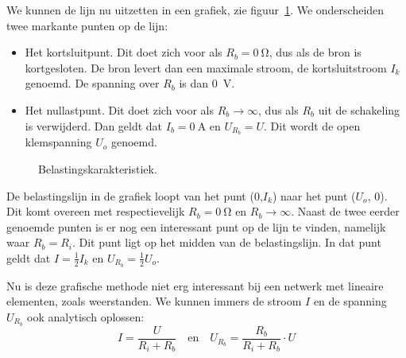 We kunnen de lijn nu uitzetten in een grafiek, zie figuur~\ref{fig:gelbelastingskarakteristiek}.
We onderscheiden twee markante punten op de lijn:

\begin{itemize}
\item Het kortsluitpunt. Dit doet zich voor als $R_b=\SI{0}{\ohm}$, dus als de bron is kortgesloten. De bron
      levert dan een maximale stroom, de kortsluitstroom $I_k$ genoemd. De spanning over $R_b$ is
      dan \SI{0}{\volt}.
\item Het nullastpunt. Dit doet zich voor als $R_b \rightarrow \infty$, dus als $R_b$ uit de schakeling
      is verwijderd. Dan geldt dat $I_b=\SI{0}{\ampere}$ en $U_{R_b}=U$. Dit wordt de open klemspanning
      $U_o$ genoemd. 
\end{itemize}

\begin{figure}[!ht]
\centering
{}
\caption{Belastingskarakteristiek.}
\label{fig:gelbelastingskarakteristiek}
\end{figure}

De belastingslijn in de grafiek loopt van het punt (0,$I_k$) naar het punt ($U_o$, 0). Dit komt overeen
met respectievelijk $R_b=\SI{0}{\ohm}$ en $R_b\rightarrow\infty$.
Naast de twee eerder genoemde punten is er nog een interessant punt op de lijn te vinden, namelijk
waar $R_b=R_i$. Dit punt ligt op het midden van de belastingslijn. In dat punt geldt dat $I=\frac{1}{2}I_k$
en $U_{R_b}=\frac{1}{2}U_o$.

Nu is deze grafische methode niet erg interessant bij een netwerk met lineaire elementen, zoals weerstanden.
We kunnen immers de stroom $I$ en de spanning $U_{R_b}$ ook analytisch oplossen:
%
\begin{equation}
I = \dfrac{U}{R_i+R_b} \quad \text{en} \quad U_{R_b} = \dfrac{R_b}{R_i+R_b}\cdot U
\end{equation}

